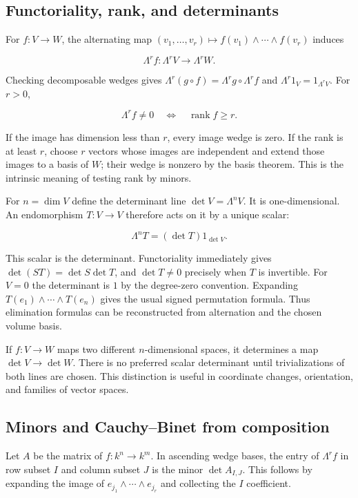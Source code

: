 \documentclass[
  11pt,
]{article}
\begin{document}
\subsection{Functoriality, rank, and
determinants}\label{functoriality-rank-and-determinants}

For \(f:V\to W\), the alternating map
\((v_1,\ldots,v_r)\mapsto f(v_1)\wedge\cdots\wedge f(v_r)\) induces

\[\Lambda^r f:\Lambda^r V\to\Lambda^r W.\]

Checking decomposable wedges gives
\(\Lambda^r(g\circ f)=\Lambda^r g\circ\Lambda^r f\) and
\(\Lambda^r1_V=1_{\Lambda^rV}\). For \(r>0\),

\[\Lambda^r f\ne0\quad\Longleftrightarrow\quad\operatorname{rank}f\ge r.\]

If the image has dimension less than \(r\), every image wedge is zero.
If the rank is at least \(r\), choose \(r\) vectors whose images are
independent and extend those images to a basis of \(W\); their wedge is
nonzero by the basis theorem. This is the intrinsic meaning of testing
rank by minors.

For \(n=\dim V\) define the determinant line \(\det V=\Lambda^nV\). It
is one-dimensional. An endomorphism \(T:V\to V\) therefore acts on it by
a unique scalar:

\[\Lambda^n T=(\det T)1_{\det V}.\]

This scalar is the determinant. Functoriality immediately gives
\(\det(ST)=\det S\det T\), and \(\det T\ne0\) precisely when \(T\) is
invertible. For \(V=0\) the determinant is \(1\) by the degree-zero
convention. Expanding \(T(e_1)\wedge\cdots\wedge T(e_n)\) gives the
usual signed permutation formula. Thus elimination formulas can be
reconstructed from alternation and the chosen volume basis.

If \(f:V\to W\) maps two different \(n\)-dimensional spaces, it
determines a map \(\det V\to\det W\). There is no preferred scalar
determinant until trivializations of both lines are chosen. This
distinction is useful in coordinate changes, orientation, and families
of vector spaces.

\subsection{Minors and Cauchy--Binet from
composition}\label{minors-and-cauchybinet-from-composition}

Let \(A\) be the matrix of \(f:k^n\to k^m\). In ascending wedge bases,
the entry of \(\Lambda^r f\) in row subset \(I\) and column subset \(J\)
is the minor \(\det A_{I,J}\). This follows by expanding the image of
\(e_{j_1}\wedge\cdots\wedge e_{j_r}\) and collecting the \(I\)
coefficient.
\end{document}
